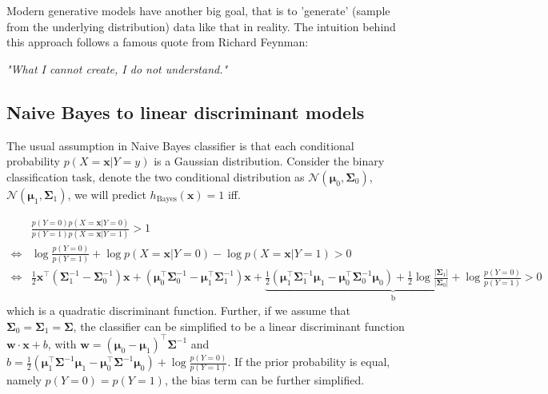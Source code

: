 \documentclass{article}
\begin{document}
	Modern generative models have another big goal, that is to 'generate' (sample from the underlying distribution) data like that in reality. The intuition behind this approach follows a famous quote from Richard Feynman:	
	\begin{center}
	\textit{"What I cannot create, I do not understand."}
	\end{center}

	\subsection{Naive Bayes to linear discriminant models}
	The usual assumption in Naive Bayes classifier is that each conditional probability $p(X=\bm{x}|Y=y)$ is a Gaussian distribution. Consider the binary classification task, denote the two conditional distribution as $\mathcal{N}(\bm{\mu}_0,\bm{\Sigma}_0)$, $\mathcal{N}(\bm{\mu}_1,\bm{\Sigma}_1)$, we will predict $h_{\mathrm{Bayes}}(\bm{x})=1$ iff.
	
	\begin{equation*}
	\begin{split}
	&\frac{p(Y=0) p(X=\bm{x}|Y=0)}{p(Y=1) p(X=\bm{x}|Y=1)} > 1 \\
	\iff &\log \frac{p(Y=0)}{p(Y=1)} + \log p(X=\bm{x}|Y=0) - \log p(X=\bm{x}|Y=1) > 0 \\
	\iff &\frac{1}{2} \bm{x}^\top ( \bm{\Sigma}_1^{-1} - \bm{\Sigma}_0^{-1}) \bm{x} + (\bm{\mu}_0^\top\bm{\Sigma}_0^{-1} - \bm{\mu}_1^\top\bm{\Sigma}_1^{-1}) \bm{x} + \underbrace{\frac{1}{2} (\bm{\mu}_1^\top\bm{\Sigma}_1^{-1}\bm{\mu}_1 - \bm{\mu}_0^\top\bm{\Sigma}_0^{-1}\bm{\mu}_0 ) + \frac{1}{2}\log\frac{|\bm{\Sigma}_1|}{|\bm{\Sigma}_0|} + \log \frac{p(Y=0)}{p(Y=1)}}_{\mathrm{b}} > 0
	\end{split}
	\end{equation*}
which is a quadratic discriminant function. Further, if we assume that $\bm{\Sigma}_0=\bm{\Sigma}_1=\bm{\Sigma}$, the classifier can be simplified to be a linear discriminant function $\bm{w}\cdot\bm{x}+b$, with $\bm{w}=(\bm{\mu}_0 - \bm{\mu}_1)^\top\bm{\Sigma}^{-1}$ and $b=\frac{1}{2} (\bm{\mu}_1^\top\bm{\Sigma}^{-1}\bm{\mu}_1 - \bm{\mu}_0^\top\bm{\Sigma}^{-1}\bm{\mu}_0 ) + \log \frac{p(Y=0)}{p(Y=1)}$. If the prior probability is equal, namely $p(Y=0)=p(Y=1)$, the bias term can be further simplified.
	
\end{document}
